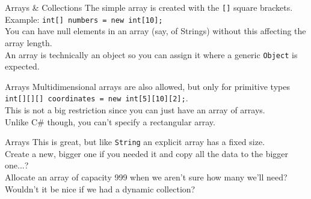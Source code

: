\documentclass{beamer}
\begin{document}
\begin{frame}{Arrays \& Collections}
The simple array is created with the \texttt{[]} square brackets. \\
\vspace{0.5em}
Example: \texttt{int[] numbers = new int[10];} \\
\vspace{0.5em}
You can have null elements in an array (say, of Strings) without this affecting the array length. \\
\vspace{0.5em}
An array is technically an object so you can assign it where a generic \texttt{Object} is expected. \\
\end{frame}



\begin{frame}{Arrays}
Multidimensional arrays are also allowed, but only for primitive types \\
\vspace{0.5em}
\texttt{int[][][]  coordinates = new int[5][10][2];}.  \\
\vspace{0.5em}
This is not a big restriction since you can just have an array of arrays. \\
\vspace{0.5em}
Unlike C\# though, you can't specify a rectangular array. \\
\end{frame}



\begin{frame}{Arrays}
This is great, but like \texttt{String} an explicit array has a fixed size. \\
\vspace{0.5em}
Create a new, bigger one if you needed it and copy all the data to the bigger one...?  \\
\vspace{0.5em}
Allocate an array of capacity 999 when we aren't sure how many we'll need? \\
\vspace{0.5em}
Wouldn't it be nice if we had a dynamic collection? \\
\end{frame}
\end{document}
